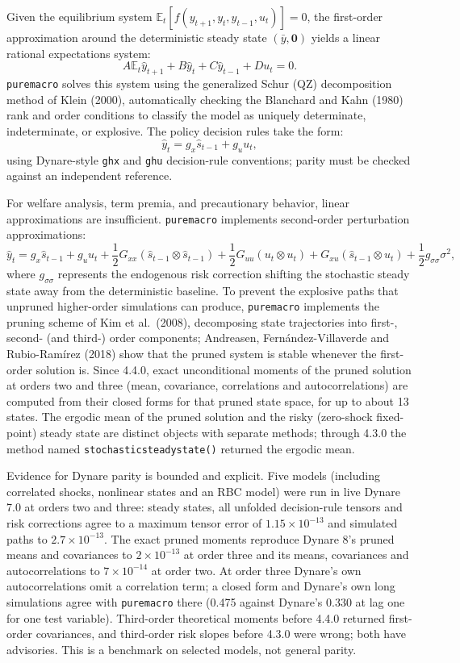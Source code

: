 \documentclass[11pt,letterpaper]{article}
\renewcommand{\_}{\pmunderscore\allowbreak}
\begin{document}
Given the equilibrium system \(\mathbb{E}_t [ f(y_{t+1}, y_t, y_{t-1}, u_t) ] = 0\), the first-order approximation around the deterministic steady state \((\bar{y}, \mathbf{0})\) yields a linear rational expectations system:
\[A \mathbb{E}_t \hat{y}_{t+1} + B \hat{y}_t + C \hat{y}_{t-1} + D u_t = 0.\]
\texttt{puremacro} solves this system using the generalized Schur (QZ) decomposition method of Klein (2000), automatically checking the Blanchard and Kahn (1980) rank and order conditions to classify the model as uniquely determinate, indeterminate, or explosive. The policy decision rules take the form:
\[\hat{y}_t = g_x \hat{s}_{t-1} + g_u u_t,\]
using Dynare-style \texttt{ghx} and \texttt{ghu} decision-rule conventions; parity must be checked against an independent reference.

For welfare analysis, term premia, and precautionary behavior, linear approximations are insufficient. \texttt{puremacro} implements second-order perturbation approximations:
\[\hat{y}_t = g_x \hat{s}_{t-1} + g_u u_t + \frac{1}{2} G_{xx} (\hat{s}_{t-1} \otimes \hat{s}_{t-1}) + \frac{1}{2} G_{uu} (u_t \otimes u_t) + G_{xu} (\hat{s}_{t-1} \otimes u_t) + \frac{1}{2} g_{\sigma\sigma} \sigma^2,\]
where \(g_{\sigma\sigma}\) represents the endogenous risk correction shifting the stochastic steady state away from the deterministic baseline. To prevent the explosive paths that unpruned higher-order simulations can produce, \texttt{puremacro} implements the pruning scheme of Kim et al.~(2008), decomposing state trajectories into first-, second- (and third-) order components; Andreasen, Fernández-Villaverde and Rubio-Ramírez (2018) show that the pruned system is stable whenever the first-order solution is. Since 4.4.0, exact unconditional moments of the pruned solution at orders two and three (mean, covariance, correlations and autocorrelations) are computed from their closed forms for that pruned state space, for up to about 13 states. The ergodic mean of the pruned solution and the risky (zero-shock fixed-point) steady state are distinct objects with separate methods; through 4.3.0 the method named \texttt{stochastic\_steady\_state()} returned the ergodic mean.

Evidence for Dynare parity is bounded and explicit. Five models (including correlated shocks, nonlinear states and an RBC model) were run in live Dynare 7.0 at orders two and three: steady states, all unfolded decision-rule tensors and risk corrections agree to a maximum tensor error of \(1.15\times10^{-13}\) and simulated paths to \(2.7\times10^{-13}\). The exact pruned moments reproduce Dynare 8's pruned means and covariances to \(2\times10^{-13}\) at order three and its means, covariances and autocorrelations to \(7\times10^{-14}\) at order two. At order three Dynare's own autocorrelations omit a correlation term; a closed form and Dynare's own long simulations agree with \texttt{puremacro} there (0.475 against Dynare's 0.330 at lag one for one test variable). Third-order theoretical moments before 4.4.0 returned first-order covariances, and third-order risk slopes before 4.3.0 were wrong; both have advisories. This is a benchmark on selected models, not general parity.
\end{document}
